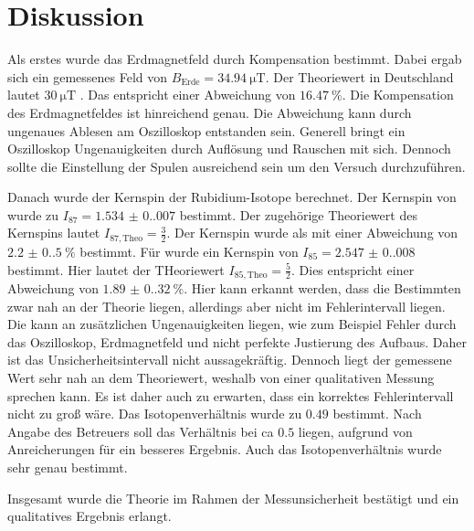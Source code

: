 \chapter{Diskussion}
\label{cha:Diskussion}
Als erstes wurde das Erdmagnetfeld durch Kompensation bestimmt. Dabei ergab sich ein gemessenes Feld von $B_\mathrm{Erde} = \qty{34.94}{\micro\tesla}$. Der Theoriewert in 
Deutschland lautet $\qty{30}{\micro\tesla}$ \cite{erdmagnetfeld}. Das entspricht einer Abweichung von $\qty{16.47}{\percent}$. Die Kompensation des Erdmagnetfeldes ist hinreichend 
genau. Die Abweichung kann durch ungenaues Ablesen am Oszilloskop entstanden sein. Generell bringt ein Oszilloskop Ungenauigkeiten durch Auflösung und Rauschen mit sich. 
Dennoch sollte die Einstellung der Spulen ausreichend sein um den Versuch durchzuführen.

Danach wurde der Kernspin der Rubidium-Isotope berechnet. Der Kernspin von  wurde zu $I_{87} = \num{1.534(0.007)}$ bestimmt. Der zugehörige Theoriewert des Kernspins 
lautet $I_{87,\mathrm{Theo}} = \frac{3}{2}$. Der Kernspin wurde als mit einer Abweichung von $\qty{2.2(0.5)}{\percent}$ bestimmt. Für  wurde ein Kernspin von 
$I_{85} = \num{2.547(0.008)}$ bestimmt. Hier lautet der THeoriewert $I_{85,\mathrm{Theo}} = \frac{5}{2}$. Dies entspricht einer Abweichung von $\qty{1.89(0.32)}{\percent}$.
Hier kann erkannt werden, dass die Bestimmten zwar nah an der Theorie liegen, allerdings aber nicht im Fehlerintervall liegen. Die kann an zusätzlichen Ungenauigkeiten liegen, wie 
zum Beispiel Fehler durch das Oszilloskop, Erdmagnetfeld und nicht perfekte Justierung des Aufbaus. Daher ist das Unsicherheitsintervall nicht aussagekräftig. Dennoch liegt der 
gemessene Wert sehr nah an dem Theoriewert, weshalb von einer qualitativen Messung sprechen kann. Es ist daher auch zu erwarten, dass ein korrektes Fehlerintervall nicht zu groß wäre. 
Das Isotopenverhältnis wurde zu $\num{0.49}$ bestimmt. Nach Angabe des Betreuers soll das Verhältnis bei ca $0.5$ liegen, aufgrund von Anreicherungen für ein besseres Ergebnis.
Auch das Isotopenverhältnis wurde sehr genau bestimmt. 

Insgesamt wurde die Theorie im Rahmen der Messunsicherheit bestätigt und ein qualitatives Ergebnis erlangt.
